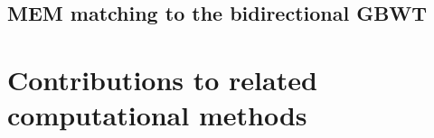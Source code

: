 \subsection{MEM matching to the bidirectional GBWT}

\section{Contributions to related computational methods}


